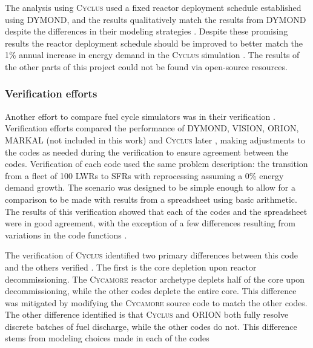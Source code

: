\documentclass{article}
\newcommand{\Cyclus}{\textsc{Cyclus}\xspace}%
\newcommand{\Cycamore}{\textsc{Cycamore}\xspace}%
\begin{document}
    The analysis using \Cyclus used a fixed reactor deployment schedule established 
    using \gls{DYMOND}, and the results qualitatively match the results from 
    \gls{DYMOND} despite the differences in their modeling strategies 
    \cite{djokic_application_2015}. Despite these promising results the 
    reactor deployment schedule should be improved to better match the 1\% 
    annual increase in energy demand in the \Cyclus simulation
    \cite{djokic_application_2015}. The results of the other parts of 
    this project could not be found via open-source resources. 


\subsubsection{Verification efforts}
    Another effort to compare fuel cycle simulators was in their verification
    \cite{feng_standardized_2016,bae_standardized_2019}. Verification efforts
    compared the performance of DYMOND, VISION, ORION, MARKAL (not included in 
    this work)
    \cite{feng_standardized_2016} and \Cyclus later \cite{bae_standardized_2019}, 
    making adjustments to the codes as needed
    during the verification to ensure agreement between the codes. Verification 
    of each code used the same problem description: the transition from 
    a fleet of 100 \glspl{LWR} to \glspl{SFR} with reprocessing assuming a
    0\% energy demand growth.  
    The scenario was designed to be simple enough to allow for a comparison 
    to be made with results from a spreadsheet using basic arithmetic. The 
    results of this 
    verification showed that each of the codes and the spreadsheet were in 
    good agreement, with the exception of a few differences resulting from 
    variations in the code functions \cite{feng_standardized_2016}.

    The verification of \Cyclus identified two primary differences between 
    this code and the others verified \cite{bae_standardized_2019}. The 
    first is the core depletion upon reactor decommissioning. The \Cycamore
    reactor archetype deplets half of the core upon decommissioning, while the 
    other codes deplete the entire core. This difference was mitigated by 
    modifying the \Cycamore source code to match the other codes. The other 
    difference identified is that \Cyclus and ORION both fully resolve 
    discrete batches of fuel discharge, while the other codes do not. This 
    difference stems from modeling choices made in each of the codes 
\end{document}
